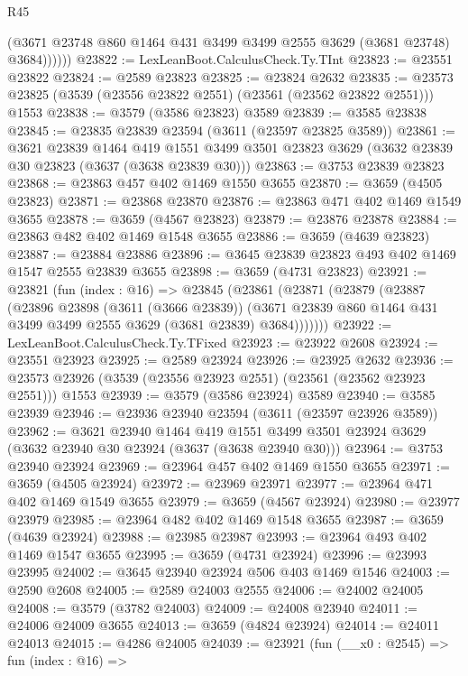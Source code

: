 \begin{lexlean}{R45}
\begin{coremodule}
              (@3671 @23748 @860 @1464 @431 @3499 @3499 @2555 @3629 (@3681 @23748) @3684))))))
@23822 := LexLeanBoot.CalculusCheck.Ty.TInt
@23823 := @23551 @23822
@23824 := @2589 @23823
@23825 := @23824 @2632
@23835 := @23573 @23825 (@3539 (@23556 @23822 @2551) (@23561 (@23562 @23822 @2551))) @1553
@23838 := @3579 (@3586 @23823) @3589
@23839 := @3585 @23838
@23845 := @23835 @23839 @23594 (@3611 (@23597 @23825 @3589))
@23861 := @3621
    @23839
    @1464
    @419
    @1551
    @3499
    @3501
    @23823
    @3629
    (@3632 @23839 @30 @23823 (@3637 (@3638 @23839 @30)))
@23863 := @3753 @23839 @23823
@23868 := @23863 @457 @402 @1469 @1550 @3655
@23870 := @3659 (@4505 @23823)
@23871 := @23868 @23870
@23876 := @23863 @471 @402 @1469 @1549 @3655
@23878 := @3659 (@4567 @23823)
@23879 := @23876 @23878
@23884 := @23863 @482 @402 @1469 @1548 @3655
@23886 := @3659 (@4639 @23823)
@23887 := @23884 @23886
@23896 := @3645 @23839 @23823 @493 @402 @1469 @1547 @2555 @23839 @3655
@23898 := @3659 (@4731 @23823)
@23921 := @23821
    (fun (index : @16) =>
    @23845
      (@23861
        (@23871
          (@23879
            (@23887
              (@23896
                @23898
                (@3611 (@3666 @23839))
                (@3671 @23839 @860 @1464 @431 @3499 @3499 @2555 @3629 (@3681 @23839) @3684)))))))
@23922 := LexLeanBoot.CalculusCheck.Ty.TFixed
@23923 := @23922 @2608
@23924 := @23551 @23923
@23925 := @2589 @23924
@23926 := @23925 @2632
@23936 := @23573 @23926 (@3539 (@23556 @23923 @2551) (@23561 (@23562 @23923 @2551))) @1553
@23939 := @3579 (@3586 @23924) @3589
@23940 := @3585 @23939
@23946 := @23936 @23940 @23594 (@3611 (@23597 @23926 @3589))
@23962 := @3621
    @23940
    @1464
    @419
    @1551
    @3499
    @3501
    @23924
    @3629
    (@3632 @23940 @30 @23924 (@3637 (@3638 @23940 @30)))
@23964 := @3753 @23940 @23924
@23969 := @23964 @457 @402 @1469 @1550 @3655
@23971 := @3659 (@4505 @23924)
@23972 := @23969 @23971
@23977 := @23964 @471 @402 @1469 @1549 @3655
@23979 := @3659 (@4567 @23924)
@23980 := @23977 @23979
@23985 := @23964 @482 @402 @1469 @1548 @3655
@23987 := @3659 (@4639 @23924)
@23988 := @23985 @23987
@23993 := @23964 @493 @402 @1469 @1547 @3655
@23995 := @3659 (@4731 @23924)
@23996 := @23993 @23995
@24002 := @3645 @23940 @23924 @506 @403 @1469 @1546
@24003 := @2590 @2608
@24005 := @2589 @24003 @2555
@24006 := @24002 @24005
@24008 := @3579 (@3782 @24003)
@24009 := @24008 @23940
@24011 := @24006 @24009 @3655
@24013 := @3659 (@4824 @23924)
@24014 := @24011 @24013
@24015 := @4286 @24005
@24039 := @23921
    (fun (__x0 : @2545) =>
    fun (index : @16) =>

\end{coremodule}
\end{lexlean}
